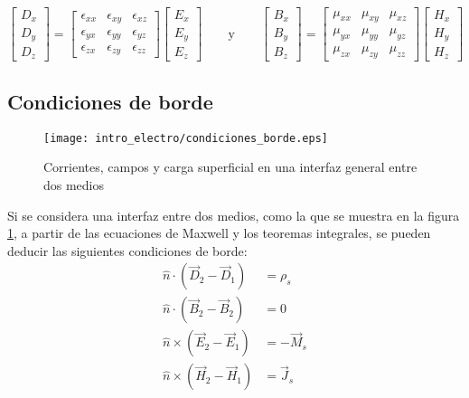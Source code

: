 \begin{equation} \label{eq:diadas}
\begin{bmatrix}
D_x \\
D_y \\
D_z
\end{bmatrix}
=
\begin{bmatrix}
\epsilon_{xx} & \epsilon_{xy} & \epsilon_{xz} \\
\epsilon_{yx} & \epsilon_{yy} & \epsilon_{yz} \\
\epsilon_{zx} & \epsilon_{zy} & \epsilon_{zz}
\end{bmatrix}
\begin{bmatrix}
E_x \\
E_y \\
E_z
\end{bmatrix}
\qquad\text{y}\qquad
\begin{bmatrix}
B_x \\
B_y \\
B_z
\end{bmatrix}
=
\begin{bmatrix}
\mu_{xx} & \mu_{xy} & \mu_{xz} \\
\mu_{yx} & \mu_{yy} & \mu_{yz} \\
\mu_{zx} & \mu_{zy} & \mu_{zz}
\end{bmatrix}
\begin{bmatrix}
H_x \\
H_y \\
H_z
\end{bmatrix}
\end{equation}

\subsection{Condiciones de borde} \label{sec:condiciones-borde}

\begin{figure}[htp]
	\centering
	\texttt{[image: intro\_electro/condiciones\_borde.eps]}
	\caption{Corrientes, campos y carga superficial en una interfaz general entre dos medios \cite{Pozar:MwEngineering}}
	\label{fig:condiciones_borde}
\end{figure}

Si se considera una interfaz entre dos medios, como la que se muestra en la figura \ref{fig:condiciones_borde}, a partir de las ecuaciones de Maxwell y los teoremas integrales, se pueden deducir las siguientes condiciones de borde:
\begin{subequations}
	\label{eq:condiciones_borde}
	\begin{align}
		\hat{n} \cdot (\vec{D}_{2} - \vec{D}_{1}) & = \rho_s \\
		\hat{n} \cdot (\vec{B}_{2} - \vec{B}_{2}) & = 0 \\
		\hat{n} \times (\vec{E}_2 - \vec{E}_1)  & = - \vec{M}_s \\
		\hat{n} \times (\vec{H}_2 - \vec{H}_1) & = \vec{J}_s
	\end{align}
\end{subequations}

